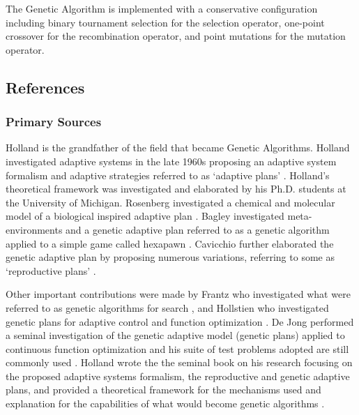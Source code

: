 The Genetic Algorithm is implemented with a conservative configuration including binary tournament selection for the selection operator, one-point crossover for the recombination operator, and point mutations for the mutation operator.



\subsection{References}
% 
% 
\subsubsection{Primary Sources}
Holland is the grandfather of the field that became Genetic Algorithms. Holland investigated adaptive systems in the late 1960s proposing an adaptive system formalism and adaptive strategies referred to as `adaptive plans' \cite{Holland1962, Holland1962a, Holland1969}. 
Holland's theoretical framework was investigated and elaborated by his Ph.D. students at the University of Michigan. Rosenberg investigated a chemical and molecular model of a biological inspired adaptive plan \cite{Rosenberg1967}. Bagley investigated meta-environments and a genetic adaptive plan referred to as a genetic algorithm applied to a simple game called hexapawn \cite{Bagley1967}. Cavicchio further elaborated the genetic adaptive plan by proposing numerous variations, referring to some as `reproductive plans' \cite{Cavicchio1970}. 

Other important contributions were made by Frantz who investigated what were referred to as genetic algorithms for search \cite{Frantz1972}, and Hollstien who investigated genetic plans for adaptive control and function optimization \cite{Hollstien1971}.
De Jong performed a seminal investigation of the genetic adaptive model (genetic plans) applied to continuous function optimization and his suite of test problems adopted are still commonly used \cite{Jong1975}.
Holland wrote the the seminal book on his research focusing on the proposed adaptive systems formalism, the reproductive and genetic adaptive plans, and provided a theoretical framework for the mechanisms used and explanation for the capabilities of what would become genetic algorithms \cite{Holland1975}.


